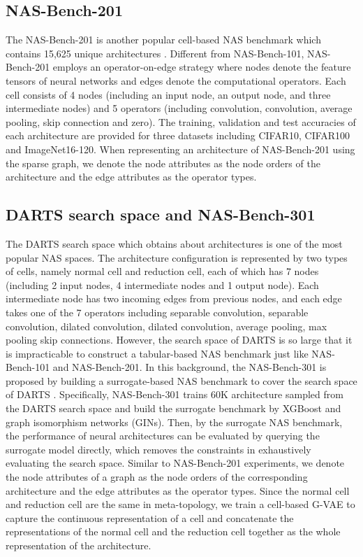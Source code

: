 \documentclass[10pt,twocolumn,letterpaper]{article}
\begin{document}
\subsection{NAS-Bench-201}
The NAS-Bench-201 is another popular cell-based NAS benchmark which contains 15,625 unique architectures \cite{DBLP:conf/iclr/Dong020}. Different from NAS-Bench-101, NAS-Bench-201 employs an operator-on-edge strategy where nodes denote the feature tensors of neural networks and edges denote the computational operators. Each cell consists of 4 nodes (including an input node, an output node, and three intermediate nodes) and 5 operators (including  convolution,  convolution,  average pooling, skip connection and zero). The training, validation and test accuracies of each architecture are provided for three datasets including CIFAR10, CIFAR100 and ImageNet16-120. When representing an architecture of NAS-Bench-201 using the sparse graph, we denote the node attributes as the node orders of the architecture and the edge attributes as the operator types. 
\subsection{DARTS search space and NAS-Bench-301}
The DARTS search space \cite{liu2018darts}  which obtains about  architectures is one of the most popular NAS spaces. The architecture configuration is represented by two types of cells, namely normal cell and reduction cell, each of which has 7 nodes (including 2 input nodes, 4 intermediate nodes and 1 output node). Each intermediate node has two incoming edges from previous nodes, and each edge takes one of the 7 operators including  separable convolution,  separable convolution,  dilated convolution,  dilated convolution,  average pooling,  max pooling skip connections. However, the search space of DARTS is so large that it is impracticable to construct a tabular-based NAS benchmark just like NAS-Bench-101 and NAS-Bench-201. In this background, the NAS-Bench-301 is proposed by building a surrogate-based NAS benchmark to cover the search space of DARTS \cite{siems2020bench}. Specifically, NAS-Bench-301 trains 60K architecture sampled from the DARTS search space and build the surrogate benchmark by XGBoost and graph isomorphism networks (GINs). Then, by the surrogate NAS benchmark, the performance of neural architectures can be evaluated by querying the surrogate model directly, which removes the constraints in exhaustively evaluating the search space. Similar to NAS-Bench-201 experiments, we denote the node attributes of a graph as the node orders of the corresponding architecture and the edge attributes as the operator types. Since the normal cell and reduction cell are the same in meta-topology, we train a cell-based G-VAE to capture the continuous representation of a cell and concatenate the representations of the normal cell and the reduction cell together as the whole representation of the architecture.
\end{document}
